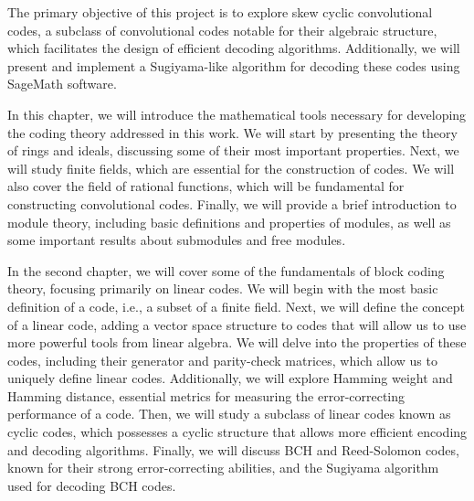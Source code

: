 %


The primary objective of this project is to explore skew cyclic convolutional codes, a subclass of convolutional codes notable for their algebraic structure, which facilitates the design of efficient decoding algorithms. Additionally, we will present and implement a Sugiyama-like algorithm for decoding these codes using SageMath software.


In this chapter, we will introduce the mathematical tools necessary for developing the coding theory addressed in this work. We will start by presenting the theory of rings and ideals, discussing some of their most important properties. Next, we will study finite fields, which are essential for the construction of codes. We will also cover the field of rational functions, which will be fundamental for constructing convolutional codes. Finally, we will provide a brief introduction to module theory, including basic definitions and properties of modules, as well as some important results about submodules and free modules.


In the second chapter, we will cover some of the fundamentals of block coding theory, focusing primarily on linear codes. We will begin with the most basic definition of a code, i.e., a subset of a finite field. Next, we will define the concept of a linear code, adding a vector space structure to codes that will allow us to use more powerful tools from linear algebra. We will delve into the properties of these codes, including their generator and parity-check matrices, which allow us to uniquely define linear codes. Additionally, we will explore Hamming weight and Hamming distance, essential metrics for measuring the error-correcting performance of a code. Then, we will study a subclass of linear codes known as cyclic codes, which possesses a cyclic structure that allows more efficient encoding and decoding algorithms. Finally, we will discuss BCH and Reed-Solomon codes, known for their strong error-correcting abilities, and the Sugiyama algorithm used for decoding BCH codes.


